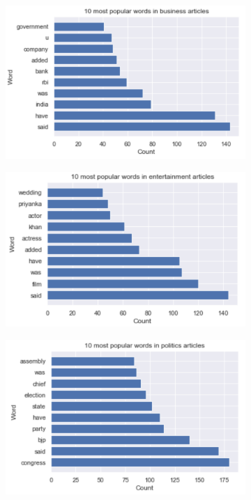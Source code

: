 \begin{figure}[H]
     \centering
     \begin{subfigure}[b]{0.7\textwidth}
         \centering
         \includegraphics[width=\textwidth]{images/analiza/business.png}
     \end{subfigure}
     \hfill
     \begin{subfigure}[b]{0.7\textwidth}
         \centering
         \includegraphics[width=\textwidth]{images/analiza/entertainment.png}
     \end{subfigure}
     \hfill
     \begin{subfigure}[b]{0.7\textwidth}
         \centering
         \includegraphics[width=\textwidth]{images/analiza/politics.png}
     \end{subfigure}
\end{figure}
